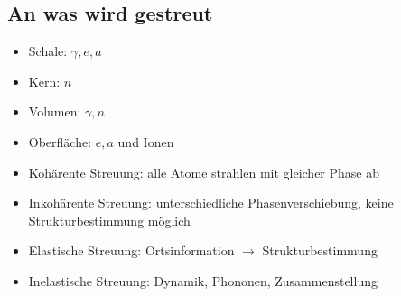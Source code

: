 \subsection*{An was wird gestreut}
\begin{itemize}
    \itemsep 0pt
    \item Schale: $\gamma, e, a$
    \item Kern: $n$
    \item Volumen: $\gamma, n$
    \item Oberfläche: $e,a$ und Ionen
    \item Kohärente Streuung: alle Atome strahlen mit gleicher Phase ab
    \item Inkohärente Streuung: unterschiedliche Phasenverschiebung, keine Strukturbestimmung möglich
    \item Elastische Streuung: Ortsinformation $\rightarrow$ Strukturbestimmung
    \item Inelastische Streuung: Dynamik, Phononen, Zusammenstellung
\end{itemize}